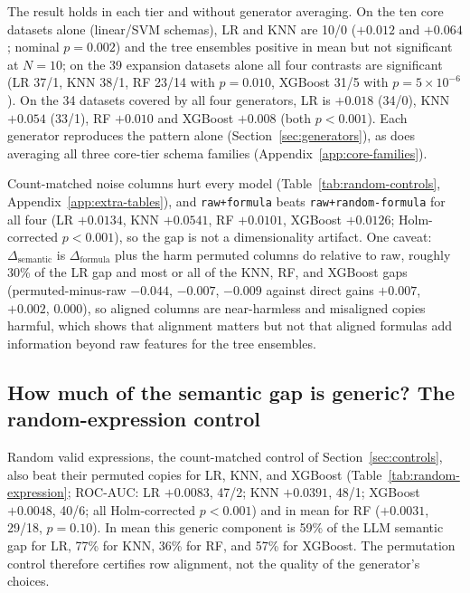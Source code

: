 The result holds in each tier and without generator averaging. On the ten core datasets alone (linear/SVM schemas), LR and KNN are 10/0 (\(+0.012\) and \(+0.064\); nominal \(p = 0.002\)) and the tree ensembles positive in mean but not significant at \(N = 10\); on the 39 expansion datasets alone all four contrasts are significant (LR 37/1, KNN 38/1, RF 23/14 with \(p = 0.010\), XGBoost 31/5 with \(p = 5 \times 10^{-6}\)). On the 34 datasets covered by all four generators, LR is \(+0.018\) (34/0), KNN \(+0.054\) (33/1), RF \(+0.010\) and XGBoost \(+0.008\) (both \(p < 0.001\)). Each generator reproduces the pattern alone (Section~\ref{sec:generators}), as does averaging all three core-tier schema families (Appendix~\ref{app:core-families}).

Count-matched noise columns hurt every model (Table~\ref{tab:random-controls}, Appendix~\ref{app:extra-tables}), and \texttt{raw+formula} beats \texttt{raw+random-formula} for all four (LR \(+0.0134\), KNN \(+0.0541\), RF \(+0.0101\), XGBoost \(+0.0126\); Holm-corrected \(p < 0.001\)), so the gap is not a dimensionality artifact. One caveat: \(\Delta_{\mathrm{semantic}}\) is \(\Delta_{\mathrm{formula}}\) plus the harm permuted columns do relative to raw, roughly 30\% of the LR gap and most or all of the KNN, RF, and XGBoost gaps (permuted-minus-raw \(-0.044\), \(-0.007\), \(-0.009\) against direct gains \(+0.007\), \(+0.002\), \(0.000\)), so aligned columns are near-harmless and misaligned copies harmful, which shows that alignment matters but not that aligned formulas add information beyond raw features for the tree ensembles.

\subsection{How much of the semantic gap is generic? The random-expression control}\label{sec:random-expression}

Random valid expressions, the count-matched control of Section~\ref{sec:controls}, also beat their permuted copies for LR, KNN, and XGBoost (Table~\ref{tab:random-expression}; ROC-AUC: LR \(+0.0083\), 47/2; KNN \(+0.0391\), 48/1; XGBoost \(+0.0048\), 40/6; all Holm-corrected \(p < 0.001\)) and in mean for RF (\(+0.0031\), 29/18, \(p = 0.10\)). In mean this generic component is 59\% of the LLM semantic gap for LR, 77\% for KNN, 36\% for RF, and 57\% for XGBoost. The permutation control therefore certifies row alignment, not the quality of the generator's choices.

